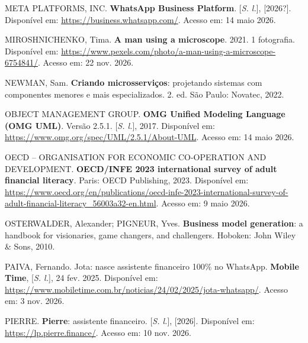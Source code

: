 \vspace{\baselineskip}

META PLATFORMS, INC. \textbf{WhatsApp Business Platform}. [\textit{S. l.}], [2026?]. Disponível em: \url{https://business.whatsapp.com/}. Acesso em: 14 maio 2026.

\vspace{\baselineskip}

MIROSHNICHENKO, Tima. \textbf{A man using a microscope}. 2021. 1 fotografia. Disponível em: \url{https://www.pexels.com/photo/a-man-using-a-microscope-6754841/}. Acesso em: 22 nov. 2026.

\vspace{\baselineskip}

NEWMAN, Sam. \textbf{Criando microsserviços}: projetando sistemas com componentes menores e mais especializados. 2. ed. São Paulo: Novatec, 2022.

\vspace{\baselineskip}

OBJECT MANAGEMENT GROUP. \textbf{OMG Unified Modeling Language (OMG UML)}. Versão 2.5.1. [\textit{S. l.}], 2017. Disponível em: \url{https://www.omg.org/spec/UML/2.5.1/About-UML}. Acesso em: 14 maio 2026.

\vspace{\baselineskip}

OECD -- ORGANISATION FOR ECONOMIC CO-OPERATION AND DEVELOPMENT. \textbf{OECD/INFE 2023 international survey of adult financial literacy}. Paris: OECD Publishing, 2023. Disponível em: \url{https://www.oecd.org/en/publications/oecd-infe-2023-international-survey-of-adult-financial-literacy_56003a32-en.html}. Acesso em: 9 maio 2026.

\vspace{\baselineskip}

OSTERWALDER, Alexander; PIGNEUR, Yves. \textbf{Business model generation}: a handbook for visionaries, game changers, and challengers. Hoboken: John Wiley \& Sons, 2010.

\vspace{\baselineskip}

PAIVA, Fernando. Jota: nasce assistente financeiro 100\% no WhatsApp. \textbf{Mobile Time}, [\textit{S. l.}], 24 fev. 2025. Disponível em: \url{https://www.mobiletime.com.br/noticias/24/02/2025/jota-whatsapp/}. Acesso em: 3 nov. 2026.

\vspace{\baselineskip}

PIERRE. \textbf{Pierre}: assistente financeiro. [\textit{S. l.}], [2026]. Disponível em: \url{https://lp.pierre.finance/}. Acesso em: 10 nov. 2026.

